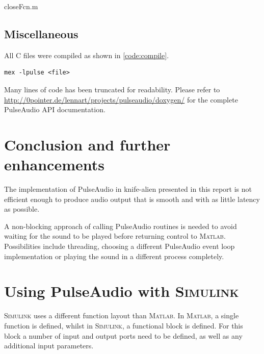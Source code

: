 \documentclass[journal]{IEEEtran}
\begin{document}

{closeFcn.m}

\subsection*{Miscellaneous}
All C files were compiled as shown in \autoref*{code:compile}.

\begin{lstlisting}[caption={How files were compiled},label={code:compile},numbers=none]
mex -lpulse <file>
\end{lstlisting}

Many lines of code has been truncated for readability. Please refer to \url{http://0pointer.de/lennart/projects/pulseaudio/doxygen/} for the complete PulseAudio API documentation.

\section{Conclusion and further enhancements}
The implementation of PulseAudio in knife-alien presented in this report is not efficient enough to produce audio output that is smooth and with as little latency as possible.

A non-blocking approach of calling PulseAudio routines is needed to avoid waiting for the sound to be played before returning control to \textsc{Matlab}. Possibilities include threading, choosing a different PulseAudio event loop implementation or playing the sound in a different process completely.

%
%

\appendix
\section*{Using PulseAudio with \textsc{Simulink}}
\label{sec:simulink}
\textsc{Simulink} uses a different function layout than \textsc{Matlab}. In \textsc{Matlab}, a single function is defined, whilst in \textsc{Simulink}, a functional block is defined. For this block a number of input and output ports need to be defined, as well as any additional input parameters.
\end{document}
